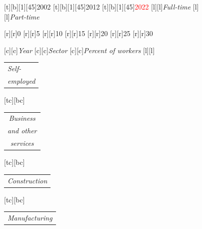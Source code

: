 \documentclass[11 pt, a4paper]{report}
\renewcommand{\arraystretch}{1.2}
\begin{document}
\begin{figure}[hbtp!]
[t][b][1][45]{\small{2002}}
[t][b][1][45]{\small{2012}}
[t][b][1][45]{\small{\textcolor{red}{2022}}}
[l][l]{\scriptsize{\emph{Full-time}}}
[l][l]{\scriptsize{\emph{Part-time}}}

[r][r]{\scriptsize{0}}
[r][r]{\scriptsize{5}}
[r][r]{\scriptsize{10}}
[r][r]{\scriptsize{15}}
[r][r]{\scriptsize{20}}
[r][r]{\scriptsize{25}}
[r][r]{\scriptsize{30}}

[c][c]{\scriptsize{\emph{Year}}}
[c][c]{\scriptsize{\emph{Sector}}}
[c][c]{\scriptsize{\emph{Percent of workers}}}
\renewcommand{\arraystretch}{0.7}
[l][l]{\scriptsize{
\begin{tabular}{@{}l}
\emph{Self-}\\
\emph{employed}
\end{tabular}}}

[tc][bc]{\scriptsize{
\begin{tabular}{c}
\emph{Business}\\
\emph{and other }\\
\emph{services}
\end{tabular}
}}
[tc][bc]{\scriptsize{
\begin{tabular}{c}
\emph{Construction}
\end{tabular}
}}
[tc][bc]{\scriptsize{
\begin{tabular}{c}
\emph{Manufacturing}
\end{tabular}
}}


\end{figure}
\end{document}
